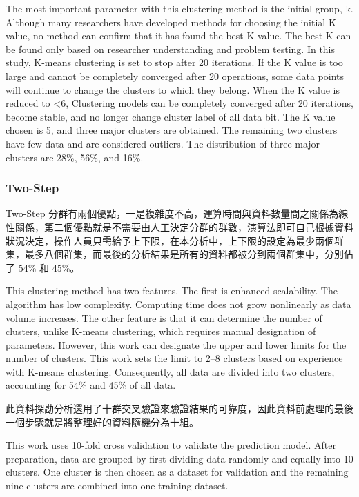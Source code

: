 The most important parameter with this clustering method is the initial group, k. Although many researchers have developed methods for choosing the initial K value, no method can confirm that it has found the best K value. The best K can be found only based on researcher understanding and problem testing. In this study, K-means clustering is set to stop after 20 iterations. If the K value is too large and cannot be completely converged after 20 operations, some data points will continue to change the clusters to which they belong. When the K value is reduced to <6, Clustering models can be completely converged after 20 iterations, become stable, and no longer change cluster label of all data bit. The K value chosen is 5, and three major clusters are obtained. The remaining two clusters have few data and are considered outliers. The distribution of three major clusters are 28\%, 56\%, and 16\%.

\subsubsection{Two-Step}

Two-Step 分群有兩個優點，一是複雜度不高，運算時間與資料數量間之關係為線性關係，第二個優點就是不需要由人工決定分群的群數，演算法即可自己根據資料狀況決定，操作人員只需給予上下限，在本分析中，上下限的設定為最少兩個群集，最多八個群集，而最後的分析結果是所有的資料都被分到兩個群集中，分別佔了 54\% 和 45\%。

This clustering method has two features. The first is enhanced scalability. The algorithm has low complexity. Computing time does not grow nonlinearly as data volume increases. The other feature is that it can determine the number of clusters, unlike K-means clustering, which requires manual designation of parameters. However, this work can designate the upper and lower limits for the number of clusters. This work sets the limit to 2–8 clusters based on experience with K-means clustering. Consequently, all data are divided into two clusters, accounting for 54\% and 45\% of all data.






此資料探勘分析還用了十群交叉驗證來驗證結果的可靠度，因此資料前處理的最後一個步驟就是將整理好的資料隨機分為十組。

This work uses 10-fold cross validation to validate the prediction model. After preparation, data are grouped by first dividing data randomly and equally into 10 clusters. One cluster is then chosen as a dataset for validation and the remaining nine clusters are combined into one training dataset.

